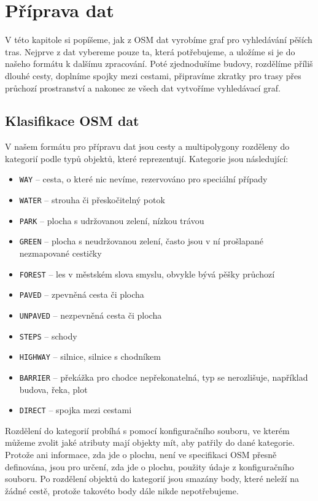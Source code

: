 \chapter{Příprava dat}
V této kapitole si popíšeme, jak z OSM dat vyrobíme graf pro vyhledávání pěších
tras. Nejprve z dat vybereme pouze ta, která potřebujeme, a uložíme si je do
našeho formátu k dalšímu zpracování. Poté zjednodušíme budovy, rozdělíme příliš
dlouhé cesty, doplníme spojky mezi cestami, připravíme zkratky pro trasy přes
průchozí prostranství a nakonec ze všech dat vytvoříme vyhledávací graf.

\section{Klasifikace OSM dat}
V našem formátu pro přípravu dat jsou cesty a multipolygony rozděleny do
kategorií podle typů objektů, které reprezentují. Kategorie jsou
následující:
\begin{itemize}
	\item \verb|WAY| -- cesta, o které nic nevíme, rezervováno pro speciální
	případy
	\item \verb|WATER| -- strouha či přeskočitelný potok
	\item \verb|PARK| -- plocha s udržovanou zelení, nízkou trávou
	\item \verb|GREEN| -- plocha s neudržovanou zelení, často jsou v ní
	prošlapané nezmapované cestičky
	\item \verb|FOREST| -- les v městském slova smyslu, obvykle bývá pěšky
	průchozí
	\item \verb|PAVED| -- zpevněná cesta či plocha
	\item \verb|UNPAVED| -- nezpevněná cesta či plocha
	\item \verb|STEPS| -- schody
	\item \verb|HIGHWAY| -- silnice, silnice s chodníkem
	\item \verb|BARRIER| -- překážka pro chodce nepřekonatelná, typ se
	nerozlišuje, například budova, řeka, plot
	\item \verb|DIRECT| -- spojka mezi cestami
\end{itemize}
Rozdělení do kategorií probíhá s pomocí konfiguračního souboru, ve kterém můžeme
zvolit jaké atributy mají objekty mít, aby patřily do dané kategorie. Protože
ani informace, zda jde o plochu, není ve specifikaci OSM přesně definována, jsou
pro určení, zda jde o plochu, použity údaje z konfiguračního souboru. Po
rozdělení objektů do kategorií jsou smazány body, které neleží na žádné cestě,
protože takovéto body dále nikde nepotřebujeme.

